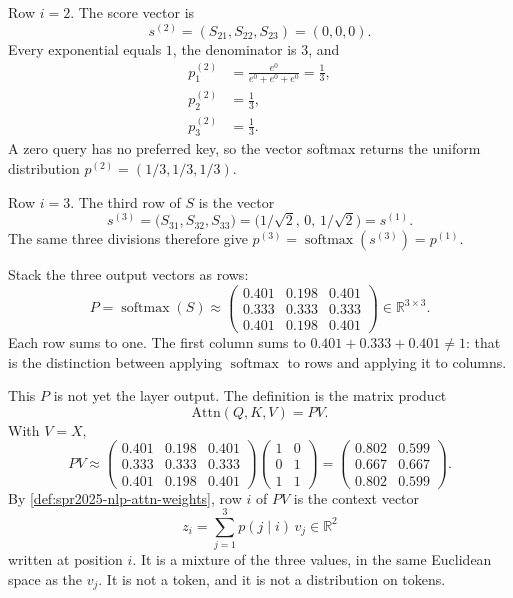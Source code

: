 \documentclass[11pt,a4paper]{article}
\DeclareMathOperator{\softmax}{softmax}
\theoremstyle{definition}
\begin{document}
\begin{example}
Row \(i=2\). The score vector is
\[
s^{(2)}=(S_{21},S_{22},S_{23})=(0,0,0).
\]
Every exponential equals \(1\), the denominator is \(3\), and
\begin{align*}
p^{(2)}_{1}
&=\frac{e^{0}}{e^{0}+e^{0}+e^{0}}
=\frac{1}{3},\\
p^{(2)}_{2}
&=\frac{1}{3},\\
p^{(2)}_{3}
&=\frac{1}{3}.
\end{align*}
A zero query has no preferred key, so the vector softmax returns the uniform distribution \(p^{(2)}=(1/3,1/3,1/3)\).

Row \(i=3\). The third row of \(S\) is the vector
\[
s^{(3)}
=\bigl(S_{31},S_{32},S_{33}\bigr)
=\bigl(1/\sqrt{2},\,0,\,1/\sqrt{2}\bigr)
=s^{(1)}.
\]
The same three divisions therefore give \(p^{(3)}=\softmax(s^{(3)})=p^{(1)}\).

Stack the three output vectors as rows:
\[
P=\softmax(S)
\approx
\begin{pmatrix}
0.401&0.198&0.401\\
0.333&0.333&0.333\\
0.401&0.198&0.401
\end{pmatrix}
\in\mathbb{R}^{3\times 3}.
\]
Each row sums to one. The first column sums to \(0.401+0.333+0.401\neq 1\): that is the distinction between applying \(\softmax\) to rows and applying it to columns.

This \(P\) is not yet the layer output. The definition is the matrix product
\[
\mathrm{Attn}(Q,K,V)=PV.
\]
With \(V=X\),
\[
PV
\approx
\begin{pmatrix}
0.401&0.198&0.401\\
0.333&0.333&0.333\\
0.401&0.198&0.401
\end{pmatrix}
\begin{pmatrix}
1&0\\
0&1\\
1&1
\end{pmatrix}
=
\begin{pmatrix}
0.802&0.599\\
0.667&0.667\\
0.802&0.599
\end{pmatrix}.
\]
By \cref{def:spr2025-nlp-attn-weights}, row \(i\) of \(PV\) is the context vector
\[
z_i=\sum_{j=1}^{3}p(j\mid i)\,v_j\in\mathbb{R}^{2}
\]
written at position \(i\). It is a mixture of the three values, in the same Euclidean space as the \(v_j\). It is not a token, and it is not a distribution on tokens.


\end{example}
\end{document}
